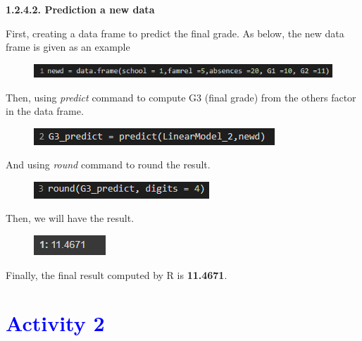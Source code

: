 \documentclass[a4paper]{article}
\begin{document}
\vspace{0.4cm}
\textbf{1.2.4.2. Prediction a new data} \\ \newline
{}
First, creating a data frame to predict the final grade. As below, the new data frame is given as an example
\begin{figure}[H]
    \centering
    \includegraphics[scale = 1.3]{Images/59.PNG}
    \label{fig:prediction5}
\end{figure}
Then, using \textit{predict} command to compute G3 (final grade) from the others
factor in the data frame.
\begin{figure}[H]
    \centering
    \includegraphics[scale = 1.5]{Images/60.PNG}
    \label{fig:prediction6}
\end{figure}
And using \textit{round} command to round the result.
\begin{figure}[H]
    \centering
    \includegraphics[scale = 1.5]{Images/61.PNG}
    \label{fig:prediction7}
\end{figure}
Then, we will have the result.
\begin{figure}[H]
    \centering
    \includegraphics[scale = 1.5]{Images/62.PNG}
    \label{fig:prediction8}
\end{figure}
Finally, the final result computed by R is \textbf{11.4671}.


\newpage
\section{\textcolor{blue}{Activity 2}}
\noindent
\end{document}
